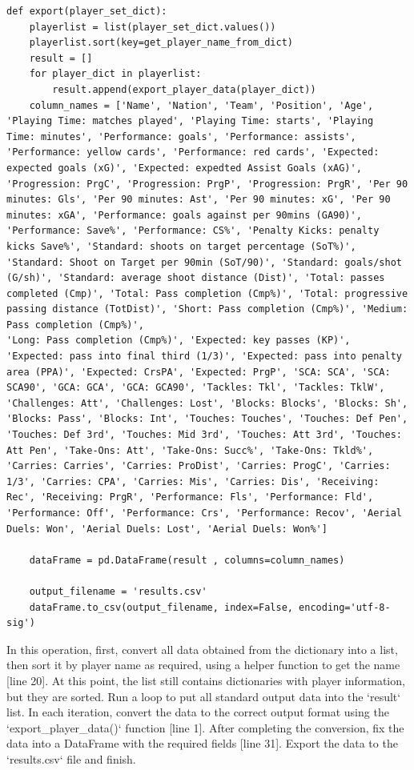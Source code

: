 \documentclass[12pt]{report}
\begin{document}
{\begin{lstlisting}
def export(player_set_dict):
    playerlist = list(player_set_dict.values())
    playerlist.sort(key=get_player_name_from_dict)
    result = []
    for player_dict in playerlist:
        result.append(export_player_data(player_dict))
    column_names = ['Name', 'Nation', 'Team', 'Position', 'Age', 'Playing Time: matches played', 'Playing Time: starts', 'Playing
Time: minutes', 'Performance: goals', 'Performance: assists', 'Performance: yellow cards', 'Performance: red cards', 'Expected: expected goals (xG)', 'Expected: expedted Assist Goals (xAG)', 'Progression: PrgC', 'Progression: PrgP', 'Progression: PrgR', 'Per 90 minutes: Gls', 'Per 90 minutes: Ast', 'Per 90 minutes: xG', 'Per 90 minutes: xGA', 'Performance: goals against per 90mins (GA90)', 'Performance: Save%', 'Performance: CS%', 'Penalty Kicks: penalty kicks Save%', 'Standard: shoots on target percentage (SoT%)', 'Standard: Shoot on Target per 90min (SoT/90)', 'Standard: goals/shot (G/sh)', 'Standard: average shoot distance (Dist)', 'Total: passes completed (Cmp)', 'Total: Pass completion (Cmp%)', 'Total: progressive passing distance (TotDist)', 'Short: Pass completion (Cmp%)', 'Medium: Pass completion (Cmp%)',
'Long: Pass completion (Cmp%)', 'Expected: key passes (KP)', 'Expected: pass into final third (1/3)', 'Expected: pass into penalty area (PPA)', 'Expected: CrsPA', 'Expected: PrgP', 'SCA: SCA', 'SCA: SCA90', 'GCA: GCA', 'GCA: GCA90', 'Tackles: Tkl', 'Tackles: TklW', 'Challenges: Att', 'Challenges: Lost', 'Blocks: Blocks', 'Blocks: Sh', 'Blocks: Pass', 'Blocks: Int', 'Touches: Touches', 'Touches: Def Pen', 'Touches: Def 3rd', 'Touches: Mid 3rd', 'Touches: Att 3rd', 'Touches: Att Pen', 'Take-Ons: Att', 'Take-Ons: Succ%', 'Take-Ons: Tkld%', 'Carries: Carries', 'Carries: ProDist', 'Carries: ProgC', 'Carries: 1/3', 'Carries: CPA', 'Carries: Mis', 'Carries: Dis', 'Receiving: Rec', 'Receiving: PrgR', 'Performance: Fls', 'Performance: Fld', 'Performance: Off', 'Performance: Crs', 'Performance: Recov', 'Aerial
Duels: Won', 'Aerial Duels: Lost', 'Aerial Duels: Won%']

    dataFrame = pd.DataFrame(result , columns=column_names)

    output_filename = 'results.csv'
    dataFrame.to_csv(output_filename, index=False, encoding='utf-8-sig')
\end{lstlisting}

In this operation, first, convert all data obtained from the dictionary into a list, then sort it by player name as required, using a helper function to get the name [line 20]. At this point, the list still contains dictionaries with player information, but they are sorted. Run a loop to put all standard output data into the `result` list. In each iteration, convert the data to the correct output format using the `export\_player\_data()` function [line 1]. After completing the conversion, fix the data into a DataFrame with the required fields [line 31]. Export the data to the `results.csv` file and finish.
\clearpage
}
\end{document}
